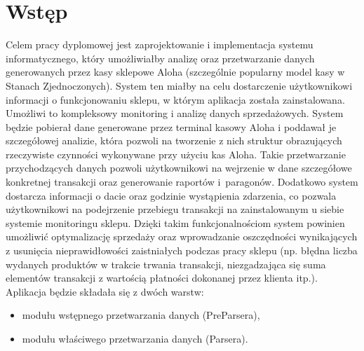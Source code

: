 \documentclass[a4paper]{book}
\author{Mateusz Stolecki}
\begin{document}

\cleardoublepage

	



\mainmatter
\chapter{Wstęp}
\label{rozdzial1}
Celem pracy dyplomowej jest zaprojektowanie i implementacja systemu informatycznego, który umożliwiałby analizę oraz przetwarzanie danych generowanych przez kasy sklepowe Aloha (szczególnie popularny model kasy w Stanach Zjednoczonych). System ten miałby na  celu dostarczenie użytkownikowi informacji o funkcjonowaniu sklepu, w którym aplikacja została zainstalowana. Umożliwi to kompleksowy monitoring i analizę danych sprzedażowych. System będzie pobierał dane generowane przez terminal kasowy Aloha i poddawał je szczegółowej analizie, która pozwoli na tworzenie z nich struktur  obrazujących rzeczywiste czynności wykonywane przy użyciu kas Aloha. Takie przetwarzanie przychodzących danych pozwoli użytkownikowi na wejrzenie w dane szczegółowe konkretnej transakcji oraz generowanie raportów i~paragonów. Dodatkowo system dostarcza informacji o dacie oraz godzinie wystąpienia zdarzenia, co pozwala użytkownikowi na podejrzenie przebiegu transakcji na zainstalowanym u siebie systemie monitoringu sklepu. Dzięki takim funkcjonalnościom system powinien umożliwić optymalizację sprzedaży oraz wprowadzanie oszczędności wynikających z usunięcia nieprawidłowości zaistniałych podczas pracy sklepu (np. błędna liczba wydanych produktów w trakcie trwania transakcji, niezgadzająca się suma elementów transakcji z wartością płatności dokonanej przez klienta itp.). Aplikacja będzie składała się z dwóch warstw:
\begin{itemize}
	\item modułu wstępnego przetwarzania danych (PreParsera),
	\item modułu właściwego przetwarzania danych (Parsera).
\end{itemize}
\end{document}
